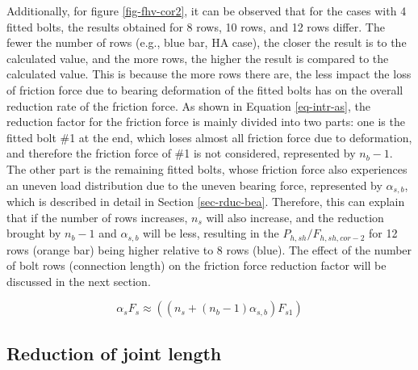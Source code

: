 Additionally, for figure \ref{fig-fhv-cor2}, it can be observed that for the cases with 4 fitted bolts, the results obtained for 8 rows, 10 rows, and 12 rows differ. The fewer the number of rows (e.g., blue bar, HA case), the closer the result is to the calculated value, and the more rows, the higher the result is compared to the calculated value. This is because the more rows there are, the less impact the loss of friction force due to bearing deformation of the fitted bolts has on the overall reduction rate of the friction force. As shown in Equation \ref{eq-intr-as}, the reduction factor for the friction force is mainly divided into two parts: one is the fitted bolt \#1 at the end, which loses almost all friction force due to deformation, and therefore the friction force of \#1 is not considered, represented by $n_b-1$. The other part is the remaining fitted bolts, whose friction force also experiences an uneven load distribution due to the uneven bearing force, represented by $\alpha_{s,b}$, which is described in detail in Section \ref{sec-rduc-bea}. Therefore, this can explain that if the number of rows increases, $n_s$ will also increase, and the reduction brought by $n_b-1$ and $\alpha_{s,b}$ will be less, resulting in the $P_{h,sh}/F_{h,sh,cor-2}$ for 12 rows (orange bar) being higher relative to 8 rows (blue). The effect of the number of bolt rows (connection length) on the friction force reduction factor will be discussed in the next section.

\begin{equation}
    \alpha_s F_s \approx ((n_s+ (n_b-1)\alpha_{s,b}) F_{s1} ) 
    \label{eq-intr-as}
\end{equation}


\subsection{Reduction of joint length}

